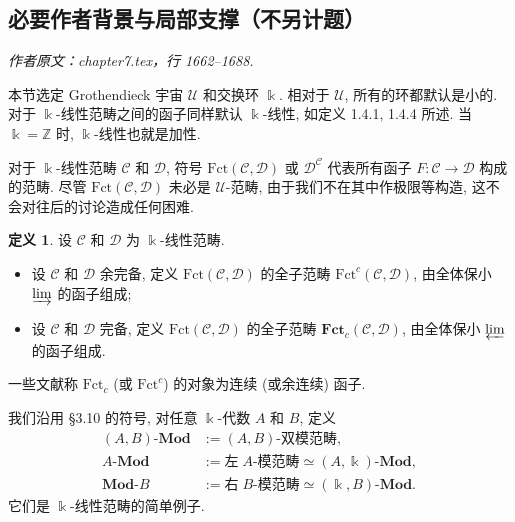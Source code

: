 \documentclass[11pt]{article}
\newcommand{\Z}{\mathbb{Z}}
\newcommand{\cate}[1]{\mathbf{#1}}
\newcommand{\cated}[1]{\mathbf{#1}\text{-}}
\newcommand{\dcate}[1]{\text{-}\mathbf{#1}}
\renewcommand{\index}[2][]{\relax}
\newcommand{\CorpusNumber}{0}
\theoremstyle{definition}
\newtheorem{definition}[theorem]{定义}
\begin{document}
\subsection*{必要作者背景与局部支撑（不另计题）}
\par\medskip\noindent\textit{作者原文：chapter7.tex，行 1662--1688.}\par
本节选定 Grothendieck 宇宙 $\mathcal{U}$ 和交换环 $\Bbbk$. 相对于 $\mathcal{U}$, 所有的环都默认是小的. 对于 $\Bbbk$-线性范畴之间的函子同样默认 $\Bbbk$-线性, 如定义 1.4.1, 1.4.4 所述. 当 $\Bbbk = \Z$ 时, $\Bbbk$-线性也就是加性.

对于 $\Bbbk$-线性范畴 $\mathcal{C}$ 和 $\mathcal{D}$, 符号 $\mathrm{Fct}(\mathcal{C}, \mathcal{D})$ 或 $\mathcal{D}^{\mathcal{C}}$ 代表所有函子 $F: \mathcal{C} \to \mathcal{D}$ 构成的范畴. 尽管 $\mathrm{Fct}(\mathcal{C}, \mathcal{D})$ 未必是 $\mathcal{U}$-范畴, 由于我们不在其中作极限等构造, 这不会对往后的讨论造成任何困难.

\def\CorpusNumber{7.7.1}
\begin{definition}
	\index[sym1]{Fctc@$\mathrm{Fct}^c, \mathrm{Fct}_c$}
	设 $\mathcal{C}$ 和 $\mathcal{D}$ 为 $\Bbbk$-线性范畴.
	\begin{itemize}
		\item 设 $\mathcal{C}$ 和 $\mathcal{D}$ 余完备, 定义 $\mathrm{Fct}(\mathcal{C}, \mathcal{D})$ 的全子范畴 $\mathrm{Fct}^c(\mathcal{C}, \mathcal{D})$, 由全体保小 $\varinjlim$ 的函子组成;
		\item 设 $\mathcal{C}$ 和 $\mathcal{D}$ 完备, 定义 $\mathrm{Fct}(\mathcal{C}, \mathcal{D})$ 的全子范畴 $\cate{Fct}_c(\mathcal{C}, \mathcal{D})$, 由全体保小 $\varprojlim$ 的函子组成.
	\end{itemize}
	一些文献称 $\mathrm{Fct}_c$ (或 $\mathrm{Fct}^c$) 的对象为连续 (或余连续) 函子.
\end{definition}

我们沿用 \S3.10 的符号, 对任意 $\Bbbk$-代数 $A$ 和 $B$, 定义
\begin{align*}
	(A, B)\dcate{Mod} & := (A, B)\text{-双模范畴}, \\
	A\dcate{Mod} & := \text{左}\; A\text{-模范畴} \simeq (A, \Bbbk)\dcate{Mod}, \\
	\cated{Mod}B & := \text{右}\; B\text{-模范畴} \simeq (\Bbbk, B)\dcate{Mod}.
\end{align*}
它们是 $\Bbbk$-线性范畴的简单例子.
\end{document}

